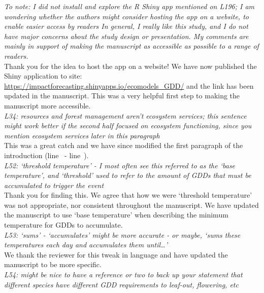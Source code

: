 \documentclass[11pt,a4paper]{article}\usepackage[]{graphicx}\usepackage[]{color}
\newcommand{\lr}[1]{line~\lineref{#1}}
\begin{document}
\textit{To note: I did not install and explore the R Shiny app mentioned on L196; I am wondering whether the authors might consider hosting the app on a website, to enable easier access by readers
In general, I really like this study, and I do not have major concerns about the study design or presentation. My comments are mainly in support of making the manuscript as accessible as possible to a range of readers.} \\

Thank you for the idea to host the app on a website! We have now published the Shiny application to site: \url{https://impactforecasting.shinyapps.io/ecomodels_GDD/} and the link has been updated in the manuscript. This was a very helpful first step to making the manuscript more accessible. \\ 

\textit{L34: resources and forest management aren't ecosystem services; this sentence might work better if the second half focused on ecosystem functioning, since you mention ecosystem services later in this paragraph} \\

This was a great catch and we have since modified the first paragraph of the introduction (\lr{Z3ecosys} - \lr{Z3ecosysend}). \\

\textit{L52: `threshold temperature' - I most often see this referred to as the `base temperature', and `threshold' used to refer to the amount of GDDs that must be accumulated to trigger the event} \\

Thank you for finding this. We agree that how we were `threshold temperature' was not appropriate, nor consistent throughout the manuscript. We have updated the manuscript to use `base temperature' when describing the minimum temperature for GDDs to accumulate. \\

\textit{L53: `sums' - `accumulates' might be more accurate - or maybe, `sums these temperatures each day and accumulates them until…'} \\

We thank the reviewer for this tweak in language and have updated the manuscript to be more specific.\\

\textit{L54: might be nice to have a reference or two to back up your statement that different species have different GDD requirements to leaf-out, flowering, etc} \\
\end{document}
